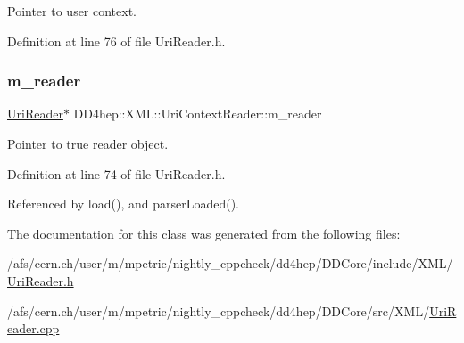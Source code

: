 Pointer to user context. 



Definition at line 76 of file Uri\+Reader.\+h.

\hypertarget{class_d_d4hep_1_1_x_m_l_1_1_uri_context_reader_a55aeba72e0e3b7ca7699c1b9fa439da8}{}\label{class_d_d4hep_1_1_x_m_l_1_1_uri_context_reader_a55aeba72e0e3b7ca7699c1b9fa439da8} 
\subsubsection{\texorpdfstring{m\+\_\+reader}{m\_reader}}
{\footnotesize\ttfamily \hyperlink{class_d_d4hep_1_1_x_m_l_1_1_uri_reader}{Uri\+Reader}$\ast$ D\+D4hep\+::\+X\+M\+L\+::\+Uri\+Context\+Reader\+::m\+\_\+reader\hspace{0.3cm}{\ttfamily [protected]}}



Pointer to true reader object. 



Definition at line 74 of file Uri\+Reader.\+h.



Referenced by load(), and parser\+Loaded().



The documentation for this class was generated from the following files\+:\begin{DoxyCompactItemize}
\item 
/afs/cern.\+ch/user/m/mpetric/nightly\+\_\+cppcheck/dd4hep/\+D\+D\+Core/include/\+X\+M\+L/\hyperlink{_uri_reader_8h}{Uri\+Reader.\+h}\item 
/afs/cern.\+ch/user/m/mpetric/nightly\+\_\+cppcheck/dd4hep/\+D\+D\+Core/src/\+X\+M\+L/\hyperlink{_uri_reader_8cpp}{Uri\+Reader.\+cpp}\end{DoxyCompactItemize}
